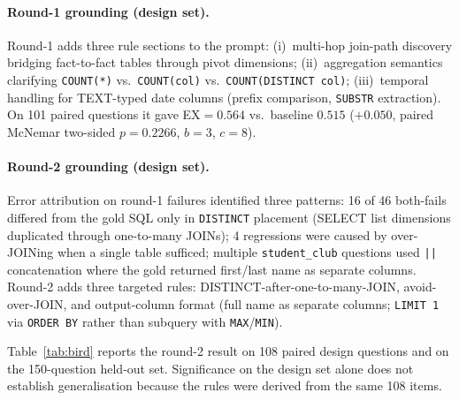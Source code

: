 \documentclass[11pt]{article}
\begin{document}
\paragraph{Round-1 grounding (design set).} Round-1 adds three rule sections to the prompt: (i)~multi-hop join-path discovery bridging fact-to-fact tables through pivot dimensions; (ii)~aggregation semantics clarifying \texttt{COUNT(*)} vs.\ \texttt{COUNT(col)} vs.\ \texttt{COUNT(DISTINCT col)}; (iii)~temporal handling for TEXT-typed date columns (prefix comparison, \texttt{SUBSTR} extraction). On 101 paired questions it gave EX$=0.564$ vs.\ baseline $0.515$ ($+0.050$, paired McNemar two-sided $p=0.2266$, $b=3$, $c=8$).

\paragraph{Round-2 grounding (design set).} Error attribution on round-1 failures identified three patterns: 16 of 46 both-fails differed from the gold SQL only in \texttt{DISTINCT} placement (SELECT list dimensions duplicated through one-to-many JOINs); 4 regressions were caused by over-JOINing when a single table sufficed; multiple \texttt{student\_club} questions used \texttt{||} concatenation where the gold returned first/last name as separate columns. Round-2 adds three targeted rules: DISTINCT-after-one-to-many-JOIN, avoid-over-JOIN, and output-column format (full name as separate columns; \texttt{LIMIT 1} via \texttt{ORDER BY} rather than subquery with \texttt{MAX}/\texttt{MIN}).

Table~\ref{tab:bird} reports the round-2 result on 108 paired design questions and on the 150-question held-out set. Significance on the design set alone does not establish generalisation because the rules were derived from the same 108 items.
\end{document}
